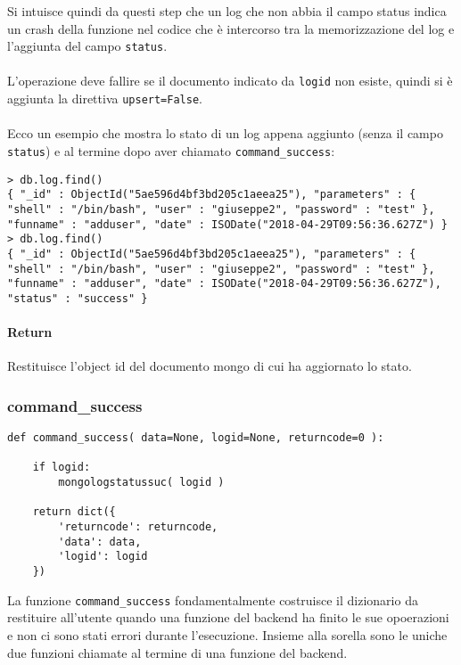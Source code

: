 \documentclass[11pt]{article}
\begin{document}
Si intuisce quindi da questi step che un log che non abbia il campo status indica un crash della funzione nel codice che è intercorso tra
la memorizzazione del log e l'aggiunta del campo \texttt{status}.
\\~\\
L'operazione deve fallire se il documento indicato da \texttt{logid} non esiste, quindi si è aggiunta la direttiva \texttt{upsert=False}.
\\~\\
Ecco un esempio che mostra lo stato di un log appena aggiunto (senza il campo \texttt{status}) e al termine dopo aver chiamato \texttt{command\string_success}:
\begin{lstlisting}
> db.log.find()
{ "_id" : ObjectId("5ae596d4bf3bd205c1aeea25"), "parameters" : { "shell" : "/bin/bash", "user" : "giuseppe2", "password" : "test" }, "funname" : "adduser", "date" : ISODate("2018-04-29T09:56:36.627Z") }
> db.log.find()
{ "_id" : ObjectId("5ae596d4bf3bd205c1aeea25"), "parameters" : { "shell" : "/bin/bash", "user" : "giuseppe2", "password" : "test" }, "funname" : "adduser", "date" : ISODate("2018-04-29T09:56:36.627Z"), "status" : "success" }
\end{lstlisting}
\paragraph{Return}
Restituisce l'object id del documento mongo di cui ha aggiornato lo stato.


\subsubsection{command\_success}\label{command\string_success}
\begin{lstlisting}
def command_success( data=None, logid=None, returncode=0 ):

    if logid:
        mongologstatussuc( logid )

    return dict({
        'returncode': returncode,
        'data': data,
        'logid': logid
    })
\end{lstlisting}
La funzione \texttt{command\_success} fondamentalmente costruisce il dizionario da restituire all'utente quando una funzione del backend
ha finito le sue opoerazioni e non ci sono stati errori durante l'esecuzione.
Insieme alla sorella  sono le uniche due funzioni chiamate al termine di una funzione del backend.
\end{document}

